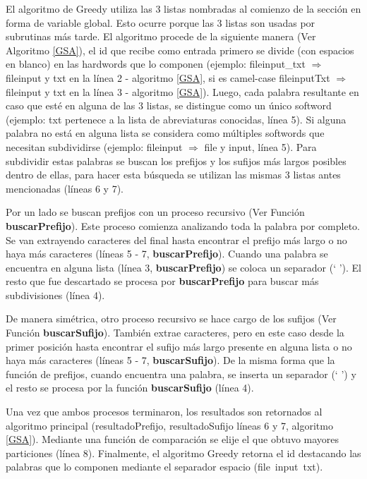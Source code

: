 El algoritmo de Greedy utiliza las 3 listas nombradas al comienzo de la sección en forma de variable global. Esto ocurre porque las 3 listas son usadas por subrutinas más tarde. El algoritmo procede de la siguiente manera (Ver Algoritmo \ref{GSA}), el id que recibe como entrada primero se divide (con espacios en blanco) en las hardwords que lo componen (ejemplo: \textsf{fileinput\_txt} $\Rightarrow$ \mbox{\textsf{fileinput}} y \textsf{txt} en la línea 2 - algoritmo \ref{GSA}, si es camel-case \textsf{fileinputTxt} $\Rightarrow$ \textsf{fileinput} y \textsf{txt} en la línea 3 - algoritmo \ref{GSA}). Luego, cada palabra resultante en caso que esté en alguna de las 3 listas, se distingue como un único softword (ejemplo: \textsf{txt} pertenece a la lista de abreviaturas conocidas, línea 5). Si alguna palabra no está en alguna lista se considera como múltiples softwords que necesitan subdividirse (ejemplo: \textsf{fileinput} $\Rightarrow$ \textsf{file} y \textsf{input}, línea 5).
Para subdividir estas palabras se buscan los prefijos y los sufijos más largos posibles dentro de ellas, para hacer esta búsqueda se utilizan las mismas 3 listas antes mencionadas (líneas 6 y 7).

Por un lado se buscan prefijos con un proceso recursivo (Ver Función \mbox{\textbf{buscarPrefijo}}). Este proceso comienza analizando toda la palabra por completo. Se van extrayendo caracteres del final hasta encontrar el prefijo más largo o no haya más caracteres (líneas 5 - 7, \textbf{buscarPrefijo}).
Cuando una palabra se encuentra en alguna lista (línea 3, \textbf{buscarPrefijo}) se coloca un separador (` '). El resto que fue descartado se procesa por \textbf{buscarPrefijo} para buscar más subdivisiones (línea 4).

De manera simétrica, otro proceso recursivo se hace cargo de los sufijos (Ver Función \textbf{buscarSufijo}). También extrae caracteres, pero en este caso desde la primer posición hasta encontrar el sufijo más largo presente en alguna lista o no haya más caracteres (líneas 5 - 7, \textbf{buscarSufijo}).
De la misma forma que la función de prefijos, cuando encuentra una palabra, se inserta un separador (` ') y el resto se procesa por la función \textbf{buscarSufijo} (línea 4).

Una vez que ambos procesos terminaron, los resultados son retornados al algoritmo principal (\textsf{resultadoPrefijo, resultadoSufijo} líneas 6 y 7, algoritmo \ref{GSA}). Mediante una función de comparación se elije el que obtuvo mayores particiones (línea 8). Finalmente, el algoritmo Greedy retorna el id destacando las palabras que lo componen mediante el separador espacio \mbox{(\textsf{file input txt})}.

